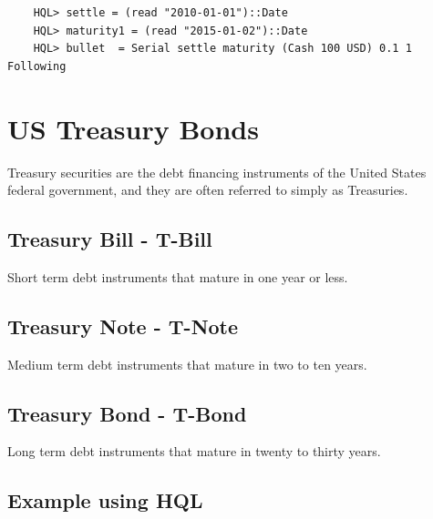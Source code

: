 \documentclass[11pt,a4paper]{article}
\numberwithin{equation}{section}
\begin{document}
	\begin{lstlisting}
	HQL> settle = (read "2010-01-01")::Date
	HQL> maturity1 = (read "2015-01-02")::Date
	HQL> bullet  = Serial settle maturity (Cash 100 USD) 0.1 1 Following
	\end{lstlisting}

	\section{US Treasury Bonds}
	Treasury securities are the debt financing instruments of the United States federal government, and they are often referred to simply as Treasuries.
	\subsection{Treasury Bill - T-Bill}
	Short term debt instruments that mature in one year or less.
	\subsection{Treasury Note - T-Note}
	Medium term debt instruments that mature in two to ten years.
	\subsection{Treasury Bond - T-Bond}
	Long term debt instruments that mature in twenty to thirty years.

	\subsection{Example using HQL}
\end{document}
